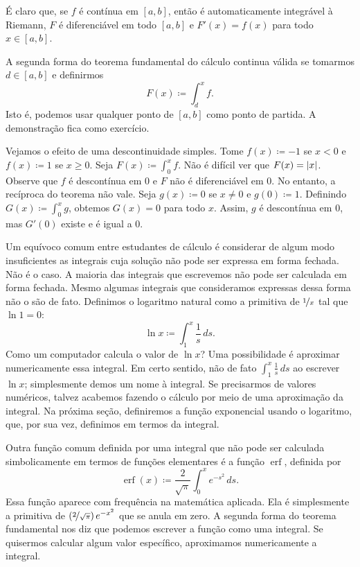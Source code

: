 É claro que, se $f$ é contínua em $[a,b]$, então é automaticamente integrável
à Riemann, $F$ é diferenciável em todo $[a,b]$ e $F'(x) = f(x)$ para todo
$x \in [a,b]$.

\begin{remark} \label{remark:fundthmbase}
A segunda forma do teorema fundamental do cálculo continua válida se
tomarmos $d \in [a,b]$ e definirmos
\begin{equation*}
F(x) \coloneqq \int_d^x f .
\end{equation*}
Isto é, podemos usar qualquer ponto de $[a,b]$ como ponto de partida. A
demonstração fica como exercício.
\end{remark}

Vejamos o efeito de uma descontinuidade simples. Tome $f(x) \coloneqq -1$ se $x
< 0$ e $f(x) \coloneqq 1$ se $x \geq 0$. Seja $F(x) \coloneqq \int_0^x f$. Não é
difícil ver que $F(x) = \lvert {x} \rvert$. Observe que $f$ é descontínua em
$0$ e $F$ não é diferenciável em $0$. No entanto, a recíproca do teorema
não vale.
Seja $g(x) \coloneqq 0$ se $x \neq 0$ e $g(0) \coloneqq 1$.
Definindo $G(x) \coloneqq \int_0^x g$,
obtemos $G(x) = 0$ para todo $x$. Assim, $g$ é descontínua
em $0$, mas $G'(0)$ existe e é igual a $0$.

Um equívoco comum entre estudantes de cálculo é considerar de algum modo
insuficientes as integrais cuja solução não pode ser expressa em forma
fechada. Não é o caso. A maioria das integrais que escrevemos não pode ser
calculada em forma fechada. Mesmo algumas integrais que consideramos
expressas dessa forma não o são de fato. Definimos o logaritmo natural como
a primitiva de $\nicefrac{1}{x}$ tal que $\ln 1 = 0$:
\begin{equation*}
\ln x \coloneqq \int_1^x \frac{1}{s}\,ds .
\end{equation*}
Como um computador calcula o valor de $\ln x$?
Uma possibilidade é aproximar numericamente essa integral.
Em certo sentido, não  de fato
$\int_1^x \frac{1}{s}\,ds$ ao escrever $\ln x$; simplesmente demos um nome
à integral. Se precisarmos de valores numéricos, talvez acabemos fazendo
o cálculo por meio de uma aproximação da integral.
Na próxima seção, definiremos a função exponencial usando o logaritmo,
que, por sua vez, definimos em termos da integral.

Outra função comum definida por uma integral que não pode
ser calculada simbolicamente em termos de funções elementares
é a função $\operatorname{erf}$, definida por
\begin{equation*}
\operatorname{erf}(x) \coloneqq \frac{2}{\sqrt{\pi}} \int_0^x e^{-s^2} \,ds .
\end{equation*}
Essa função aparece com frequência na matemática aplicada. Ela é simplesmente
a primitiva de $\left(\nicefrac{2}{\sqrt{\pi}}\right) e^{-x^2}$ que se anula
em zero.
A segunda forma do teorema fundamental nos diz que podemos escrever a função
como uma integral. Se quisermos calcular algum valor específico, aproximamos
numericamente a integral.

